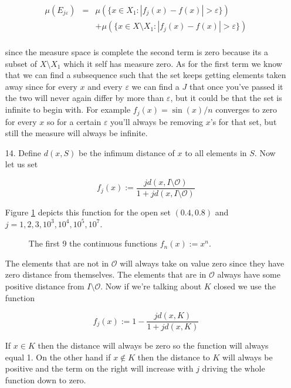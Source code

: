 \documentclass[oneside]{book}
\begin{document}
\begin{enumerate}
\begin{eqnarray}
\mu(E_{j \varepsilon}) &=& \mu(\{ x \in X_1: |f_j(x)-f(x)| > \varepsilon \}) \nonumber\\
&&+\mu( \{ x \in X \setminus X_1: |f_j(x)-f(x)| > \varepsilon \}) \nonumber\\
\end{eqnarray}

since the measure space is complete the second term is zero because its a subset of $X \setminus X_1$ which it self has measure zero. As for the first term we know that we can find a subsequence such that the set keeps getting elements taken away since for every $x$ and every $\varepsilon$ we can find a $J$ that once you've passed it the two will never again differ by more than $\varepsilon$, but it could be that the set is infinite to begin with. For example $f_j(x)=\sin(x) /n$ converges to zero for every $x$ so for a certain $\varepsilon$ you'll always be removing $x$'s for that set, but still the measure will always be infinite. 

\item[14.] Define $d(x,S)$ be the infimum distance of $x$ to all elements in $S$. Now let us set

\begin{equation}
f_j(x) := \frac{jd(x,I \setminus \mathcal{O})}{1+jd(x,I \setminus \mathcal{O})}
\end{equation}

Figure \ref{fig:continuousToCharacteristic} depicts this function for the open set $(0.4,0.8)$ and $j=1,2,3,10^3,10^4,10^5,10^7$.

\begin{figure}[h]
    \centering
    \caption{The first 9 the continuous functions $f_n(x) := x^n$.}
    \label{fig:continuousToCharacteristic}
\end{figure}

The elements that are not in $\mathcal{O}$ will always take on value zero since they have zero distance from themselves. The elements that are in $\mathcal{O}$ always have some positive distance from $I \setminus \mathcal{O}$. Now if we're talking about $K$ closed we use the function

\begin{equation}
f_j(x) := 1- \frac{jd(x,K)}{1+jd(x,K)}
\end{equation}

If $x\in K$ then the distance will always be zero so the function will always equal 1. On the other hand if $x \notin K$ then the distance to $K$ will always be positive and the term on the right will increase with $j$ driving the whole function down to zero.


\end{enumerate}
\end{document}
